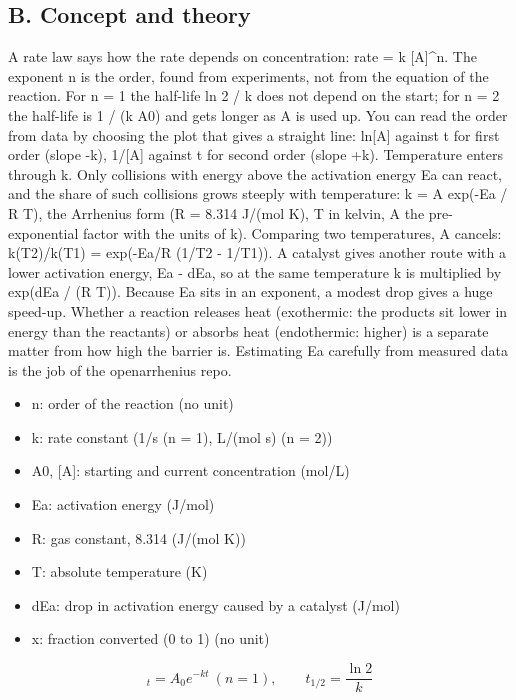 \documentclass[11pt,a4paper]{article}
\begin{document}
\subsection*{B. Concept and theory}
A rate law says how the rate depends on concentration: rate = k [A]\textasciicircum{}n. The exponent n is the order, found from experiments, not from the equation of the reaction. For n = 1 the half-life ln 2 / k does not depend on the start; for n = 2 the half-life is 1 / (k A0) and gets longer as A is used up. You can read the order from data by choosing the plot that gives a straight line: ln[A] against t for first order (slope -k), 1/[A] against t for second order (slope +k). Temperature enters through k. Only collisions with energy above the activation energy Ea can react, and the share of such collisions grows steeply with temperature: k = A exp(-Ea / R T), the Arrhenius form (R = 8.314 J/(mol K), T in kelvin, A the pre-exponential factor with the units of k). Comparing two temperatures, A cancels: k(T2)/k(T1) = exp(-Ea/R (1/T2 - 1/T1)). A catalyst gives another route with a lower activation energy, Ea - dEa, so at the same temperature k is multiplied by exp(dEa / (R T)). Because Ea sits in an exponent, a modest drop gives a huge speed-up. Whether a reaction releases heat (exothermic: the products sit lower in energy than the reactants) or absorbs heat (endothermic: higher) is a separate matter from how high the barrier is. Estimating Ea carefully from measured data is the job of the openarrhenius repo.

\begin{itemize}[nosep]
\item n: order of the reaction (no unit)
\item k: rate constant (1/s (n = 1), L/(mol s) (n = 2))
\item A0, [A]: starting and current concentration (mol/L)
\item Ea: activation energy (J/mol)
\item R: gas constant, 8.314 (J/(mol K))
\item T: absolute temperature (K)
\item dEa: drop in activation energy caused by a catalyst (J/mol)
\item x: fraction converted (0 to 1) (no unit)
\end{itemize}

\begin{equation*}
[A]_t=A_0e^{-kt}\ (n=1),\qquad t_{1/2}=\frac{\ln 2}{k}
\end{equation*}
\end{document}
